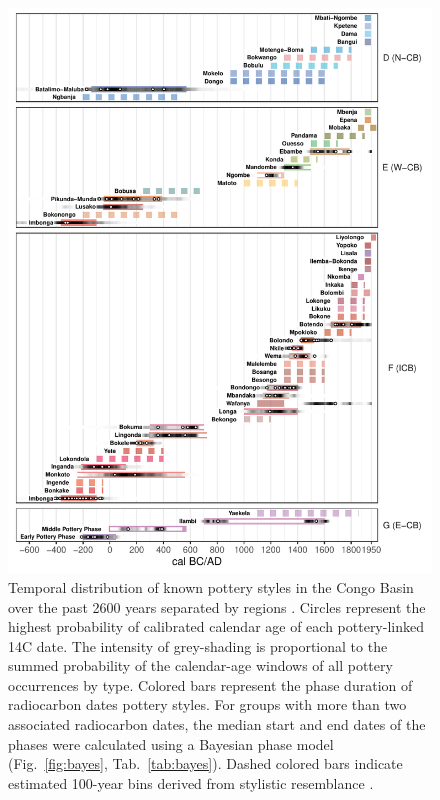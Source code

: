 \documentclass[smallextended,natbib]{svjour3}       %
\begin{document}
\begin{figure}[!tbp]
	\centering
	\includegraphics[width=\textwidth]{fig/fig_chronology.pdf}
	\caption{Temporal distribution of known pottery styles in the Congo Basin over the past 2600 years separated by regions \citep[Fig. 1; D) Norther Congo Basin, E) Western Congo Basin, F) Inner Congo Basin, G) Eastern Congo Basin]{Seidensticker.2021}. Circles represent the highest probability of calibrated calendar age of each pottery-linked 14C date. The intensity of grey-shading is proportional to the summed probability of the calendar-age windows of all pottery occurrences by type. Colored bars represent the phase duration of radiocarbon dates pottery styles. For groups with more than two associated radiocarbon dates, the median start and end dates of the phases were calculated using a Bayesian phase model (Fig.~\ref{fig:bayes}, Tab.~\ref{tab:bayes}). Dashed colored bars indicate estimated 100-year bins derived from stylistic resemblance \citep[Data S2]{Seidensticker.2021}.}
	\label{fig:chrono}
\end{figure}
\end{document}
